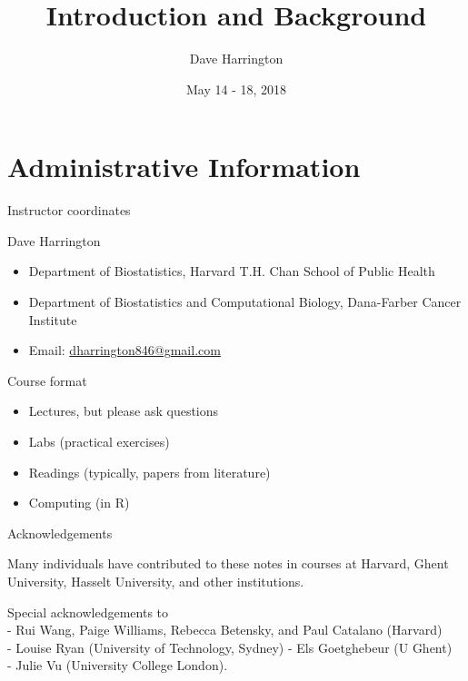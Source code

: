 \documentclass[ignorenonframetext,]{beamer}
\title{Introduction and Background}
\author{Dave Harrington}
\date{May 14 - 18, 2018}
\providecommand{\tightlist}{%
  \setlength{\itemsep}{0pt}\setlength{\parskip}{0pt}}
\begin{document}
\frame{\titlepage}

\begin{frame}
\tableofcontents[hideallsubsections]
\end{frame}
\hypertarget{administrative-information}{%
\section{Administrative Information}\label{administrative-information}}

\begin{frame}{%
\protect\hypertarget{instructor-coordinates}{%
Instructor coordinates}}

Dave Harrington

\begin{itemize}
\tightlist
\item
  Department of Biostatistics, Harvard T.H. Chan School of Public
  Health\\
\item
  Department of Biostatistics and Computational Biology, Dana-Farber
  Cancer Institute
\item
  Email:
  \href{mailto:dharrington846@gmail.com}{dharrington846@gmail.com}
\end{itemize}

\end{frame}

\begin{frame}{%
\protect\hypertarget{course-format}{%
Course format}}

\begin{itemize}
\tightlist
\item
  Lectures, but please ask questions
\item
  Labs (practical exercises)
\item
  Readings (typically, papers from literature)
\item
  Computing (in \textsf{R})
\end{itemize}

\end{frame}

\begin{frame}{%
\protect\hypertarget{acknowledgements}{%
Acknowledgements}}

Many individuals have contributed to these notes in courses at Harvard,
Ghent University, Hasselt University, and other institutions.

Special acknowledgements to\\
- Rui Wang, Paige Williams, Rebecca Betensky, and Paul Catalano
(Harvard)\\
- Louise Ryan (University of Technology, Sydney) - Els Goetghebeur (U
Ghent)\\
- Julie Vu (University College London).

\end{frame}
\end{document}
